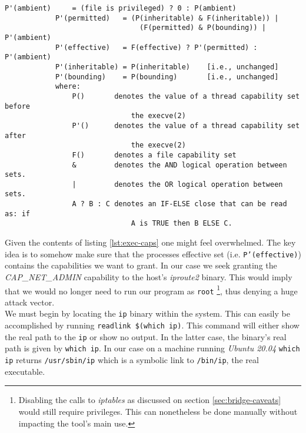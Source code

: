         \begin{lstlisting}[language = {}, caption = Transformation of Capabilities During \texttt{execve()}., label = lst:exec-caps]
            P'(ambient)     = (file is privileged) ? 0 : P(ambient)
            P'(permitted)   = (P(inheritable) & F(inheritable)) |
                                (F(permitted) & P(bounding)) | P'(ambient)
            P'(effective)   = F(effective) ? P'(permitted) : P'(ambient)
            P'(inheritable) = P(inheritable)    [i.e., unchanged]
            P'(bounding)    = P(bounding)       [i.e., unchanged]
            where:
                P()       denotes the value of a thread capability set before
                              the execve(2)
                P'()      denotes the value of a thread capability set after
                              the execve(2)
                F()       denotes a file capability set
                &         denotes the AND logical operation between sets.
                |         denotes the OR logical operation between sets.
                A ? B : C denotes an IF-ELSE close that can be read as: if
                              A is TRUE then B ELSE C.
        \end{lstlisting}

        Given the contents of listing \ref{lst:exec-caps} one might feel overwhelmed. The key idea is to somehow make sure that the processes effective set (i.e. \texttt{P'(effective)}) contains the capabilities we want to grant. In our case we seek granting the \textit{CAP\_NET\_ADMIN} capability to the host's \textit{iproute2} binary. This would imply that we would no longer need to run our program as \texttt{root} \footnote{Disabling the calls to \textit{iptables} as discussed on section \ref{sec:bridge-caveats} would still require privileges. This can nonetheless be done manually without impacting the tool's main use.}, thus denying a huge attack vector.\\

        We must begin by locating the \texttt{ip} binary within the system. This can easily be accomplished by running \texttt{\allowbreak readlink \$(which ip)}. This command will either show the real path to the \texttt{ip} or show no output. In the latter case, the binary's real path is given by \texttt{which ip}. In our case on a machine running \textit{Ubuntu 20.04} \texttt{which ip} returns \texttt{/usr/sbin/ip} which is a symbolic link to \texttt{/bin/ip}, the real executable.\\

